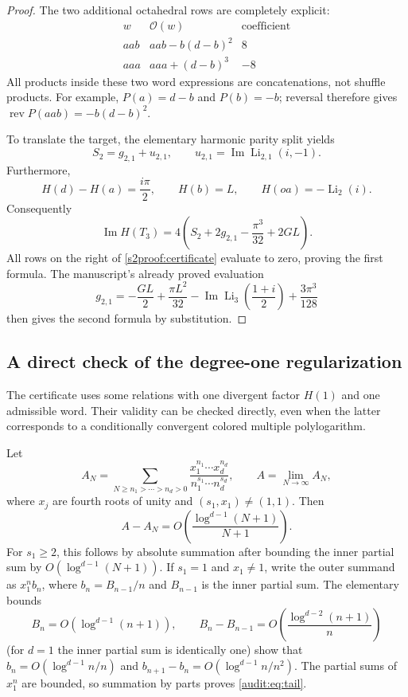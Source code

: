 \documentclass[11pt]{article}
\numberwithin{equation}{section}
\theoremstyle{plain}
\theoremstyle{definition}
\theoremstyle{remark}
\begin{document}
\begin{proof}
The two additional octahedral rows are completely explicit:
\[
\begin{array}{c|l|r}
w&\mathcal O(w)&\text{coefficient}\\ \hline
aab&aab-b(d-b)^2&8\\
aaa&aaa+(d-b)^3&-8
\end{array}
\]
All products inside these two word expressions are concatenations,
not shuffle products.  For example, $P(a)=d-b$ and $P(b)=-b$;
reversal therefore gives
$\operatorname{rev}P(aab)=-b(d-b)^2$.

To translate the target, the elementary harmonic parity split yields
\[
 S_2=g_{2,1}+u_{2,1},\qquad
 u_{2,1}=\operatorname{Im}\operatorname{Li}_{2,1}(i,-1).
\]
Furthermore,
\[
 H(d)-H(a)=\frac{i\pi}{2},\qquad H(b)=L,\qquad
 H(oa)=-\operatorname{Li}_2(i).
\]
Consequently
\[
 \operatorname{Im}H(T_3)
 =4\left(S_2+2g_{2,1}-\frac{\pi^3}{32}+2GL\right).
\]
All rows on the right of \eqref{s2proof:certificate} evaluate to zero,
proving the first formula.  The manuscript's already proved evaluation
\[
 g_{2,1}=-\frac{GL}{2}+\frac{\pi L^2}{32}
 -\operatorname{Im}\operatorname{Li}_3\!\left(\frac{1+i}{2}\right)
 +\frac{3\pi^3}{128}
\]
then gives the second formula by substitution.
\end{proof}

\subsection{A direct check of the degree-one regularization}\label{sec:regularization}
The certificate uses some relations with one divergent factor $H(1)$
and one admissible word. Their validity can be checked directly, even
when the latter corresponds to a conditionally convergent colored
multiple polylogarithm.

Let
\[
 A_N=\sum_{N\ge n_1>\cdots>n_d>0}
       \frac{x_1^{n_1}\cdots x_d^{n_d}}
       {n_1^{s_1}\cdots n_d^{s_d}},\qquad A=\lim_{N\to\infty}A_N,
\]
where $x_j$ are fourth roots of unity and $(s_1,x_1)\ne(1,1)$.
Then
\begin{equation}\label{audit:eq:tail}
 A-A_N=O\!\left(\frac{\log^{d-1}(N+1)}{N+1}\right).
\end{equation}
For $s_1\ge2$, this follows by absolute summation after bounding the
inner partial sum by $O(\log^{d-1}(N+1))$. If $s_1=1$ and $x_1\ne1$,
write the outer summand as $x_1^n b_n$, where
$b_n=B_{n-1}/n$ and $B_{n-1}$ is the inner partial sum. The elementary
bounds
\[
 B_n=O(\log^{d-1}(n+1)),\qquad
 B_n-B_{n-1}=O\!\left(\frac{\log^{d-2}(n+1)}n\right)
\]
(for $d=1$ the inner partial sum is identically one) show that
$b_n=O(\log^{d-1}n/n)$ and
$b_{n+1}-b_n=O(\log^{d-1}n/n^2)$. The partial sums of $x_1^n$ are
bounded, so summation by parts proves \eqref{audit:eq:tail}.
\end{document}
